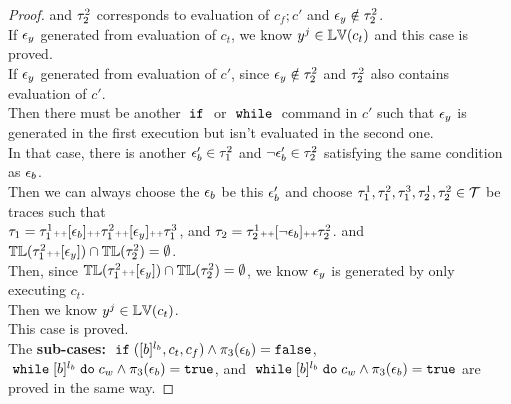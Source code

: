 \begin{proof}
and 
$\mathtt{\tau}^2_2$ corresponds to evaluation of $c_f;c'$ and $\mathtt{\epsilon}_y \notin \mathtt{\tau}^2_2$.
\\
If $\mathtt{\epsilon}_y$ generated from evaluation of $c_t$, we know $y^j \in \mathbb{LV}(c_t)$ and this case is proved.
\\
If $\mathtt{\epsilon}_y$ generated from evaluation of $c'$, since $\mathtt{\epsilon}_y \notin \mathtt{\tau}^2_2$ and $\mathtt{\tau}^2_2$ also contains evaluation of $c'$.
\\
Then there must be another $\;\mathtt{if}\;$ or $\;\mathtt{while}\;$ command in $c'$ such that $\mathtt{\epsilon}_y$ is generated in the first execution 
but isn't evaluated in the second one.
\\
In that case, there is another $\mathtt{\epsilon}_b' \in \mathtt{\tau}_1^2$ and $\neg\mathtt{\epsilon}_b' \in \mathtt{\tau}^2_2$ satisfying the same condition as $\mathtt{\epsilon}_b$.
\\
Then we can always choose the $\mathtt{\epsilon}_b$ be this $\mathtt{\epsilon}_b'$ and choose $\mathtt{\tau}_1^1, \mathtt{\tau}_1^2, \mathtt{\tau}_1^3, \mathtt{\tau}_2^1, \mathtt{\tau}_2^2 \in \mathcal{T}$ be traces
such that 
\\
$\mathtt{\tau}_1 = \mathtt{\tau}_1^1 {\scriptscriptstyle ++} [\mathtt{\epsilon}_b] {\scriptscriptstyle ++}  \mathtt{\tau}_1^2 {\scriptscriptstyle ++} [\mathtt{\epsilon}_y] {\scriptscriptstyle ++} \mathtt{\tau}_1^3$,
and $\mathtt{\tau}_2 = \mathtt{\tau}^1_2 {\scriptscriptstyle ++} [\neg\mathtt{\epsilon}_b] {\scriptscriptstyle ++}  \mathtt{\tau}^2_2$.
and $\mathbb{TL}(\mathtt{\tau}_1^2 {\scriptscriptstyle ++} [\mathtt{\epsilon}_y]) \cap \mathbb{TL}(\mathtt{\tau}^2_2) = \emptyset$.
\\
Then, since $\mathbb{TL}(\mathtt{\tau}_1^2 {\scriptscriptstyle ++} [\mathtt{\epsilon}_y]) \cap \mathbb{TL}(\mathtt{\tau}^2_2) = \emptyset$, 
we know 
$\mathtt{\epsilon}_y$ is generated 
by only executing $c_t$.
\\
Then we know $y^j \in \mathbb{LV}(c_t)$.
\\
This case is proved.
\\
The \textbf{sub-cases:} 
{$\;\mathtt{if}\; ([b]^{l_b}, c_t, c_f) \land \pi_3(\mathtt{\epsilon}_b) = \mathtt{false}$},
$\;\mathtt{while}\; [b]^{l_b} \;\mathtt{do}\; c_w\land \pi_3(\mathtt{\epsilon}_b) = \mathtt{true}$, 
and $\;\mathtt{while}\; [b]^{l_b} \;\mathtt{do}\; c_w \land \pi_3(\mathtt{\epsilon}_b) = \mathtt{true}$ 
are proved in the same way.

\end{proof}
